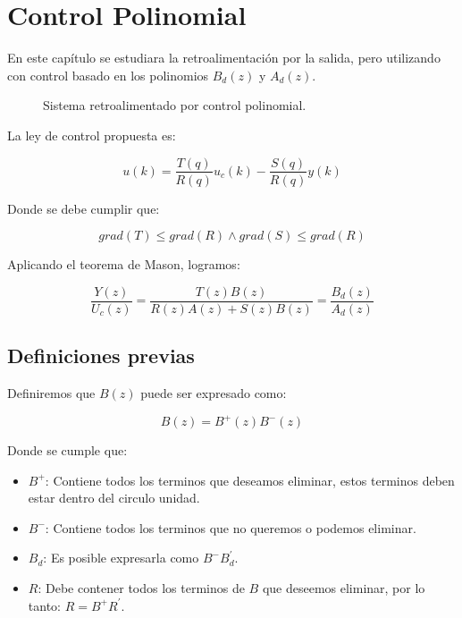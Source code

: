 \chapter{Control Polinomial}

En este capítulo se estudiara la retroalimentación por la salida, 
pero utilizando con control basado en los polinomios $B_d(z)$ y $A_d(z)$.

\begin{figure}
    
    \caption{Sistema retroalimentado por control polinomial.}
    \label{fig:control-polinomial}
\end{figure}

La ley de control propuesta es:

\begin{equation}
    u(k) = \frac{T(q)}{R(q)}u_c(k) - \frac{S(q)}{R(q)}y(k)
\end{equation}

Donde se debe cumplir que: 

\begin{equation}
    grad(T) \leq grad(R) \land grad(S) \leq grad(R)
\end{equation}

Aplicando el teorema de Mason, logramos:

\begin{equation}
    \label{eq:pol-basica}
   \frac{Y(z)}{U_c(z)} = \frac{T(z)B(z)}{R(z)A(z) + S(z)B(z)} = \frac{B_d(z)}{A_d(z)}
\end{equation}


\section{Definiciones previas}

Definiremos que $B(z)$ puede ser expresado como:

\begin{equation}
    B(z) = B^+(z)B^-(z)
\end{equation}

Donde se cumple que: 

\begin{itemize}
    \item $B^+$: Contiene todos los terminos que deseamos eliminar, estos terminos deben estar dentro del circulo unidad.
    \item $B^-$: Contiene todos los terminos que no queremos o podemos eliminar.
    \item $B_d$: Es posible expresarla como $B^-B_d^\prime$.
    \item $R$: Debe contener todos los terminos de $B$ que deseemos eliminar, por lo tanto: $R=B^+R^\prime$.
\end{itemize}

